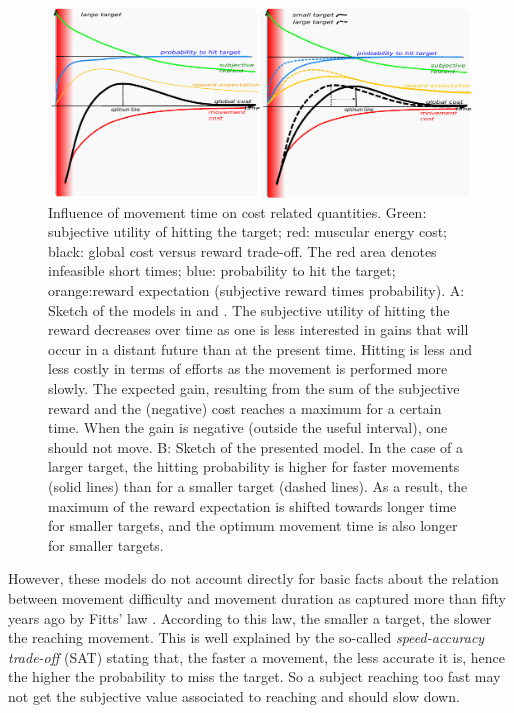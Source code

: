 \documentclass[10pt]{article}
\begin{document}
\begin{figure}[hbt]
\centering
	\includegraphics[width=1.0\columnwidth]{images/canu_fig3.pdf}
\caption{Influence of movement time on cost related quantities.
Green: subjective utility of hitting the target; red: muscular energy cost; black: global cost versus reward trade-off. The red area denotes infeasible short times; blue: probability to hit the target; orange:reward expectation (subjective reward times probability).
 A: Sketch of the models in \cite{shadmehr10} and \cite{rigoux12}.
The subjective utility of hitting the reward decreases over time as one is less interested in gains that will occur in a distant future than at the present time. Hitting is less and less costly in terms of efforts as the movement is performed more slowly.
The expected gain, resulting from the sum of the subjective reward and the (negative) cost reaches a maximum for a certain time. When the gain is negative (outside the useful interval), one should not move.
B: Sketch of the presented model.
In the case of a larger target, the hitting probability is higher for faster movements (solid lines) than for a smaller target (dashed lines). As a result, the maximum of the reward expectation is shifted towards longer time for smaller targets, and the optimum movement time is also longer for smaller targets.\label{fig:mvt_acc}}
\end{figure}

However, these models do not account directly for basic facts about the relation between movement difficulty and movement duration as captured more than fifty years ago by Fitts' law \cite{fitts54_JEP}.
According to this law, the smaller a target, the slower the reaching movement. 
This is well explained by the so-called {\em speed-accuracy trade-off} (SAT) stating that, the faster a movement, the less accurate it is, hence the higher the probability to miss the target. So a subject reaching too fast may not get the subjective value associated to reaching and should slow down.
\end{document}
